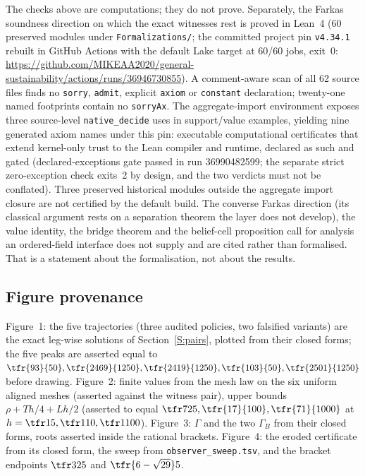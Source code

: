 The checks above are computations; they do not prove. Separately, the Farkas soundness direction on which the exact witnesses rest is proved in Lean~4 (60 preserved modules under \texttt{Formalizations/}; the committed project pin \texttt{v4.34.1} rebuilt in GitHub Actions with the default Lake target at 60/60 jobs, exit~0: \url{https://github.com/MIKEAA2020/general-sustainability/actions/runs/36946730855}). A comment-aware scan of all 62 source files finds no \texttt{sorry}, \texttt{admit}, explicit \texttt{axiom} or \texttt{constant} declaration; twenty-one named footprints contain no \texttt{sorryAx}. The aggregate-import environment exposes three source-level \texttt{native\_decide} uses in support/value examples, yielding nine generated axiom names under this pin: executable computational certificates that extend kernel-only trust to the Lean compiler and runtime, declared as such and gated (declared-exceptions gate passed in run 36990482599; the separate strict zero-exception check exits~2 by design, and the two verdicts must not be conflated). Three preserved historical modules outside the aggregate import closure are not certified by the default build. The converse Farkas direction (its classical argument rests on a separation theorem the layer does not develop), the value identity, the bridge theorem and the belief-cell proposition call for analysis an ordered-field interface does not supply and are cited rather than formalised. That is a statement about the formalisation, not about the results.

\subsection{Figure provenance}

Figure~1: the five trajectories (three audited policies, two falsified variants) are the exact leg-wise solutions of Section~\ref{S:pairs}, plotted from their closed forms; the five peaks are asserted equal to $\tfr{93}{50},\tfr{2469}{1250},\tfr{2419}{1250},\tfr{103}{50},\tfr{2501}{1250}$ before drawing. Figure~2: finite values from the mesh law on the six uniform aligned meshes (asserted against the witness pair), upper bounds $\rho+Th/4+Lh/2$ (asserted to equal $\tfr7{25},\tfr{17}{100},\tfr{71}{1000}$ at $h=\tfr15,\tfr1{10},\tfr1{100}$). Figure~3: $\Gamma$ and the two $\Gamma_B$ from their closed forms, roots asserted inside the rational brackets. Figure~4: the eroded certificate from its closed form, the sweep from \texttt{observer\_sweep.tsv}, and the bracket endpoints $\tfr3{25}$ and $\tfr{6-\sqrt{29}}5$.
